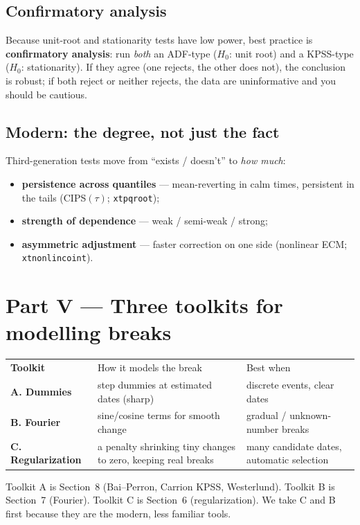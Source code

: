 \documentclass[11pt,a4paper]{article}
\newcommand{\cmd}[1]{\texttt{\textcolor{camber}{#1}}}
\newcommand{\hlt}[2]{\textcolor{#1}{\textbf{#2}}}
\theoremstyle{definition}
\begin{document}
\subsection{Confirmatory analysis}
Because unit-root and stationarity tests have low power, best practice is \hlt{cblue}{confirmatory
analysis}: run \emph{both} an ADF-type ($H_0$: unit root) and a KPSS-type ($H_0$: stationarity). If
they agree (one rejects, the other does not), the conclusion is robust; if both reject or neither
rejects, the data are uninformative and you should be cautious.

\subsection{Modern: the degree, not just the fact}
Third-generation tests move from ``exists / doesn't'' to \emph{how much}:
\begin{itemize}[leftmargin=1.4em,itemsep=0pt]
 \item \hlt{cpink}{persistence across quantiles} --- mean-reverting in calm times, persistent in the
 tails (CIPS$(\tau)$; \cmd{xtpqroot});
 \item \hlt{ccyan}{strength of dependence} --- weak / semi-weak / strong;
 \item \hlt{camber}{asymmetric adjustment} --- faster correction on one side (nonlinear ECM;
 \cmd{xtnonlincoint}).
\end{itemize}

\section{Part V --- Three toolkits for modelling breaks}

\begin{center}
\begin{tabular}{@{}>{\bfseries}p{2.8cm} p{6.2cm} p{5.4cm}@{}}
\rowcolor{cblue}\color{white}Toolkit & \color{white}How it models the break & \color{white}Best when\\
A. Dummies & step dummies at estimated dates (sharp) & discrete events, clear dates\\
B. Fourier & sine/cosine terms for smooth change & gradual / unknown-number breaks\\
C. Regularization & a penalty shrinking tiny changes to zero, keeping real breaks & many candidate
dates, automatic selection\\
\end{tabular}
\end{center}
Toolkit A is Section~8 (Bai--Perron, Carrion KPSS, Westerlund). Toolkit B is Section~7 (Fourier).
Toolkit C is Section~6 (regularization). We take C and B first because they are the modern, less
familiar tools.
\end{document}
